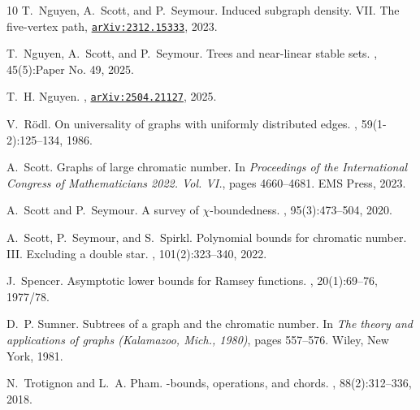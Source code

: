 \documentclass[11pt,reqno]{amsart}
\begin{document}
\begin{thebibliography}{10}
		T.~Nguyen, A.~Scott, and P.~Seymour.
		\newblock Induced subgraph density. VII. The five-vertex path,
		\href{https://arxiv.org/abs/2312.15333}{\tt arXiv:2312.15333}, 2023.
		
		T.~Nguyen, A.~Scott, and P.~Seymour.
		\newblock Trees and near-linear stable sets.
		, 45(5):Paper No. 49, 2025.
		
		T.~H. Nguyen.
		,
		\href{https://arxiv.org/abs/2504.21127}{\tt arXiv:2504.21127}, 2025.
		
		V.~R\"{o}dl.
		\newblock On universality of graphs with uniformly distributed edges.
		, 59(1-2):125--134, 1986.
		
		A.~Scott.
		\newblock Graphs of large chromatic number.
		\newblock In {\em Proceedings of the {I}nternational {C}ongress of
			{M}athematicians 2022. {V}ol. {VI}.}, pages 4660--4681. EMS Press, 2023.
		
		A.~Scott and P.~Seymour.
		\newblock A survey of {$\chi$}-boundedness.
		, 95(3):473--504, 2020.
		
		A.~Scott, P.~Seymour, and S.~Spirkl.
		\newblock Polynomial bounds for chromatic number. {III}. {E}xcluding a double
		star.
		, 101(2):323--340, 2022.
		
		J.~Spencer.
		\newblock Asymptotic lower bounds for {R}amsey functions.
		, 20(1):69--76, 1977/78.
		
		D.~P. Sumner.
		\newblock Subtrees of a graph and the chromatic number.
		\newblock In {\em The theory and applications of graphs ({K}alamazoo, {M}ich.,
			1980)}, pages 557--576. Wiley, New York, 1981.
		
		N.~Trotignon and L.~A. Pham.
		\newblock {$\chi$}-bounds, operations, and chords.
		, 88(2):312--336, 2018.
		
	\end{thebibliography}
	
\end{document}
